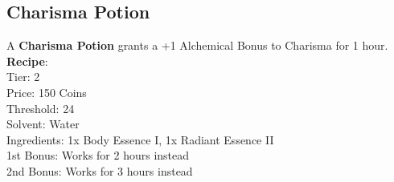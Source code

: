 \subsection{Charisma Potion}\label{potion:charismaPotion}
A \textbf{Charisma Potion} grants a +1 Alchemical Bonus to Charisma for 1 hour.\\
\textbf{Recipe}:\\
Tier: 2\\
Price: 150 Coins\\
Threshold: 24\\
Solvent: Water\\
Ingredients: 1x Body Essence I, 1x Radiant Essence II\\
1st Bonus: Works for 2 hours instead\\
2nd Bonus: Works for 3 hours instead